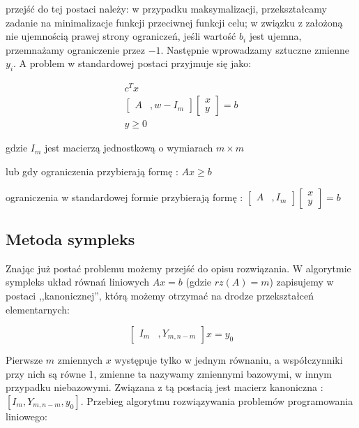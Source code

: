 \documentclass{classrep}
\begin{document}
przejść do tej postaci należy: w przypadku maksymalizacji, przekształcamy zadanie na minimalizacje funkcji przeciwnej funkcji celu; w związku z założoną nie ujemnością prawej strony ograniczeń, jeśli wartość $b_i$ jest ujemna, przemnażamy ograniczenie przez $-1$. Następnie wprowadzamy sztuczne zmienne $y_i$. A problem w standardowej postaci przyjmuje się jako:

\begin{align}
c^{T}x \nonumber \\
\left[ \begin{smallmatrix} A &,w -I_m \end{smallmatrix} \right] \left[ \begin{smallmatrix} x\\y \end{smallmatrix} \right] = b \nonumber \\
y \geq 0
\end{align}

gdzie $I_m$ jest macierzą jednostkową o wymiarach $m \times m$

lub gdy ograniczenia przybierają formę : $Ax \geq b$

ograniczenia w standardowej formie przybierają formę : 
$\left[ \begin{smallmatrix} A &, I_m \end{smallmatrix} \right] \left[ \begin{smallmatrix} x\\y \end{smallmatrix} \right] = b$

\subsection{Metoda sympleks}

Znając już postać problemu możemy przejść do opisu rozwiązania. W algorytmie sympleks układ równań liniowych $Ax=b$ (gdzie $rz(A)=m$) zapisujemy w postaci ,,kanonicznej'', którą możemy otrzymać na drodze przekształceń elementarnych:

$$\left[ \begin{smallmatrix} I_m &, Y_{m,n-m} \end{smallmatrix} \right] x = y_0 $$

Pierwsze $m$ zmiennych $x$ występuje tylko w jednym równaniu, a współczynniki przy nich są równe 1, zmienne ta nazywamy zmiennymi bazowymi, w innym przypadku niebazowymi. Związana z tą postacią jest macierz kanoniczna : $\left[  I_m , Y_{m,n-m}, y_0 \right] $. Przebieg algorytmu rozwiązywania problemów programowania liniowego:
\end{document}
